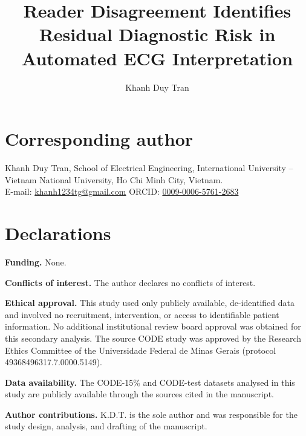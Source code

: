 \documentclass[preprint,12pt]{elsarticle}
\begin{document}
\begin{frontmatter}

\title{Reader Disagreement Identifies Residual Diagnostic Risk in Automated
ECG Interpretation}

\author[iu]{Khanh Duy Tran}

\address[iu]{School of Electrical Engineering, International University --
Vietnam National University, Ho Chi Minh City, Vietnam}


\end{frontmatter}

\section*{Corresponding author}

Khanh Duy Tran, School of Electrical Engineering, International University --
Vietnam National University, Ho Chi Minh City, Vietnam. \\
E-mail: \href{mailto:khanh1234tg@gmail.com}{khanh1234tg@gmail.com} \quad
ORCID: \href{https://orcid.org/0009-0006-5761-2683}{0009-0006-5761-2683}

\section*{Declarations}
\setlength{\parskip}{0.55em}

\noindent\textbf{Funding.} None.

\noindent\textbf{Conflicts of interest.} The author declares no conflicts of
interest.

\noindent\textbf{Ethical approval.} This study used only publicly available,
de-identified data and involved no recruitment, intervention, or access to
identifiable patient information. No additional institutional review board
approval was obtained for this secondary analysis. The source CODE study was
approved by the Research Ethics Committee of the Universidade Federal de
Minas Gerais (protocol 49368496317.7.0000.5149).

\noindent\textbf{Data availability.} The CODE-15\% and CODE-test datasets
analysed in this study are publicly available through the sources cited in
the manuscript.

\noindent\textbf{Author contributions.} K.D.T. is the sole author and was
responsible for the study design, analysis, and drafting of the manuscript.
\end{document}
